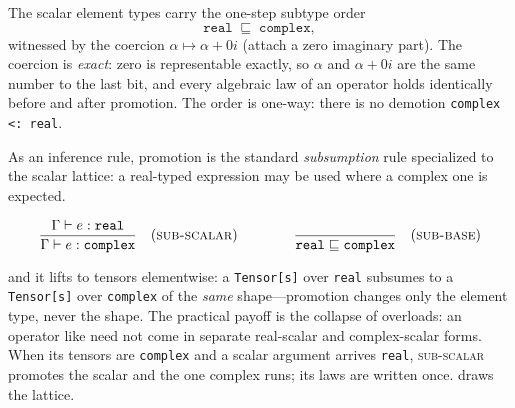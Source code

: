 \begin{definition}
\label{def:b-promotion}
The scalar element types carry the one-step subtype order
\[
  \texttt{real} \;\sqsubseteq\; \texttt{complex},
\]
witnessed by the coercion $\alpha \mapsto \alpha + 0i$ (attach a zero imaginary
part). The coercion is \emph{exact}: zero is representable exactly, so $\alpha$ and
$\alpha + 0i$ are the same number to the last bit, and every algebraic law of an
operator holds identically before and after promotion. The order is one-way: there
is no demotion \lstinline[style=l4style]|complex <: real|.
\end{definition}

As an inference rule, promotion is the standard \emph{subsumption} rule
specialized to the scalar lattice: a real-typed expression may be used where a
complex one is expected.

\[
  \dfrac{\Gamma \vdash e : \texttt{real}}
        {\Gamma \vdash e : \texttt{complex}}\quad(\textsc{sub-scalar})
  \qquad\qquad
  \dfrac{}{\texttt{real} \sqsubseteq \texttt{complex}}\quad(\textsc{sub-base})
\]

\noindent and it lifts to tensors elementwise: a
\lstinline[style=l4style]|Tensor[s]| over \texttt{real} subsumes to a
\lstinline[style=l4style]|Tensor[s]| over \texttt{complex} of the \emph{same}
shape---promotion changes only the element type, never the shape. The practical
payoff is the collapse of overloads: an operator like  need not come in
separate real-scalar and complex-scalar forms. When its tensors are \texttt{complex}
and a scalar argument arrives \texttt{real}, \textsc{sub-scalar} promotes the scalar
and the one complex  runs; its laws are written once.
 draws the lattice.

